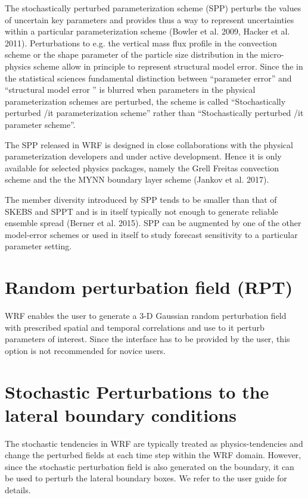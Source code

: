 The stochastically perturbed parameterization scheme (SPP)
perturbs the values of uncertain key parameters and provides 
thus a way to represent uncertainties within a particular parameterization scheme
(Bowler et al. 2009, Hacker et al. 2011).
Perturbations to e.g. the vertical mass flux profile 
in the convection scheme or the shape parameter of the particle size distribution in the
micro-physics scheme allow in principle to represent structural model error.
Since the in the statistical sciences fundamental distinction between ``parameter error'' and 
``structural model error '' is blurred when parameters in the physical parameterization schemes 
are perturbed, the scheme is called ``Stochastically perturbed {/it parameterization} scheme''
rather than ``Stochastically perturbed {/it parameter} scheme''. 

The SPP released in WRF is designed in close collaborations with the physical
parameterization developers and under active development. Hence it is only
available for selected physics packages, namely the Grell Freitas convection
scheme and the the MYNN boundary layer scheme (Jankov et al. 2017).

The member diversity introduced by SPP tends to be smaller than that of SKEBS and SPPT 
and is in itself typically not enough to generate reliable ensemble spread (Berner et al. 2015).
SPP can be augmented by one of the other model-error schemes or used in itself to study 
forecast sensitivity to a particular parameter setting.

\section {Random perturbation field (RPT)}
WRF enables the user to generate a 3-D Gaussian random perturbation field
with prescribed spatial and temporal correlations and use to it perturb
parameters of interest.  Since the interface has to be provided by the
user, this option is not recommended for novice users.

\section {Stochastic Perturbations to the lateral boundary conditions}
The stochastic tendencies in WRF are typically treated as physics-tendencies and change the 
perturbed fields at each time step within the WRF domain. However, since the stochastic
perturbation field is also generated on the boundary, it can be used to perturb the lateral boundary 
boxes. We refer to the user guide for details.

